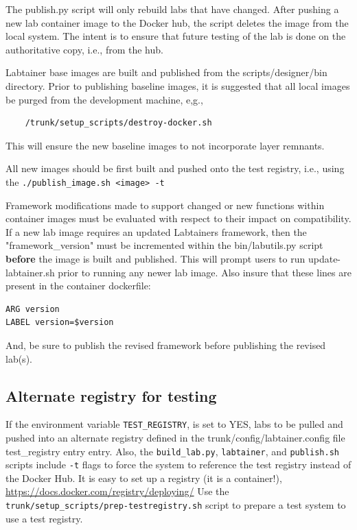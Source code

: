 \documentclass[12pt]{article}
\begin{document}
The publish.py script will only rebuild labs that have changed.  After pushing a new lab container
image to the Docker hub, the script deletes the image from the local system.  The intent is to
ensure that future testing of the lab is done on the authoritative copy, i.e., from the hub.

Labtainer base images are built and published from the scripts/designer/bin directory.  Prior to publishing
baseline images, it is suggested that all local images be purged from the development machine, e,g.,
\begin{verbatim}
    /trunk/setup_scripts/destroy-docker.sh
\end{verbatim}
\noindent This will ensure the new baseline images to not incorporate layer remnants.

All new images should be first built and pushed onto the test registry, i.e., using the 
{\tt ./publish\_image.sh <image> -t}

Framework modifications made to support changed or new functions within container images
must be evaluated with respect to their impact on compatibility. If a new lab image requires
an updated Labtainers framework, then the "framework\_version" must be incremented within the
bin/labutils.py script \textbf{before} the image is built and published.  This will prompt users
to run update-labtainer.sh prior to running any newer lab image. 
Also insure that these lines are present in the container dockerfile:
\begin{verbatim}
ARG version
LABEL version=$version
\end{verbatim}
\noindent And, be sure to publish the revised framework before publishing the revised lab(s).

\subsection{Alternate registry for testing}
If the environment variable {\tt TEST\_REGISTRY}, is set to YES, labs to be pulled and pushed
into an alternate registry defined in the trunk/config/labtainer.config file test\_registry entry entry.
Also, the {\tt build\_lab.py}, {\tt labtainer}, and {\tt publish.sh} scripts include {\tt -t} flags to
force the system to reference the test registry instead of the Docker Hub.
It is easy to set up a registry (it is a container!), \url{https://docs.docker.com/registry/deploying/}
Use the {\tt trunk/setup\_scripts/prep-testregistry.sh} script to
prepare a test system to use a test registry.
\end{document}
